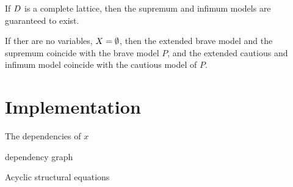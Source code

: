 \begin{fact}
If $D$ is a complete lattice, then the supremum and infimum models are guaranteed to exist.
\end{fact}
\begin{fact}
If ther are no variables, $X = \emptyset$, then the extended brave model and the supremum coincide with the brave model $P$, and the extended cautious and infimum model coincide with the cautious model of $P$.
\end{fact}

\section{Implementation}
The dependencies of $x$

dependency graph

Acyclic structural equations
